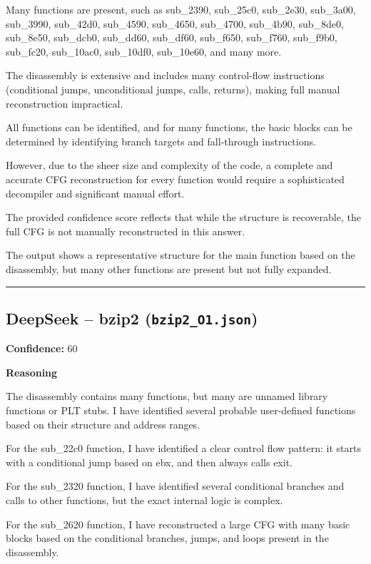 Many functions are present, such as sub\_2390, sub\_25c0, sub\_2e30, sub\_3a00, sub\_3990, sub\_42d0, sub\_4590, sub\_4650, sub\_4700, sub\_4b90, sub\_8de0, sub\_8e50, sub\_dcb0, sub\_dd60, sub\_df60, sub\_f650, sub\_f760, sub\_f9b0, sub\_fc20, sub\_10ac0, sub\_10df0, sub\_10e60, and many more.

The disassembly is extensive and includes many control-flow instructions (conditional jumps, unconditional jumps, calls, returns), making full manual reconstruction impractical.

All functions can be identified, and for many functions, the basic blocks can be determined by identifying branch targets and fall-through instructions.

However, due to the sheer size and complexity of the code, a complete and accurate CFG reconstruction for every function would require a sophisticated decompiler and significant manual effort.

The provided confidence score reflects that while the structure is recoverable, the full CFG is not manually reconstructed in this answer.

The output shows a representative structure for the main function based on the disassembly, but many other functions are present but not fully expanded.

\bigskip
\hrule
\bigskip

\subsection{DeepSeek -- bzip2 (\texttt{bzip2\_O1.json})}

\textbf{Confidence:} 60

\textbf{Reasoning}

The disassembly contains many functions, but many are unnamed library functions or PLT stubs. I have identified several probable user-defined functions based on their structure and address ranges.

For the sub\_22c0 function, I have identified a clear control flow pattern: it starts with a conditional jump based on ebx, and then always calls exit.

For the sub\_2320 function, I have identified several conditional branches and calls to other functions, but the exact internal logic is complex.

For the sub\_2620 function, I have reconstructed a large CFG with many basic blocks based on the conditional branches, jumps, and loops present in the disassembly.

